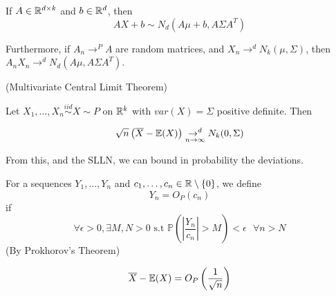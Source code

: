 \documentclass[a4paper]{article}
\begin{document}
If $A \in \mathbb{R}^{d\times k}$ and $b \in \mathbb{R}^{d}$, then
\[
	AX + b \sim N_{d}\left( A\mu + b, A\Sigma A^{T} \right) 
\] 

Furthermore, if $A_{n} \to^{P} A$ are random matrices, and $X_n \to ^{d} N_{k}\left( \mu, \Sigma \right) $, then $A_n X_n \to ^{d} N_{d}\left( A\mu, A\Sigma A^{T} \right) $.

\begin{thm}
	(Multivariate Central Limit Theorem)

	Let $X_1, \ldots, X_n \stackrel{iid}{\sim} X \sim P$ on $\mathbb{R}^{k}$ with $var(X) = \Sigma$ positive definite. Then

	 \[
		 \sqrt{n} \left( \overline{X} - \mathbb{E}(X) \right) \underset{n \to \infty}{\to ^{d}} N_{k}(0, \Sigma)
	\] 
\end{thm}

From this, and the SLLN, we can bound in probability the deviations.

\begin{defn}
	For a sequences $Y_1, \ldots, Y_n$ and $c_1, \ldots, c_n \in \mathbb{R}\setminus\{0\}$, we define 
	 \[
		 Y_n = O_{P}(c_n)
	\]
	if
	\[
		\forall \epsilon > 0, \exists M,N > 0 \text{ s.t } \mathbb{P}\left( \left| \frac{Y_n}{c_n} \right| > M \right) < \epsilon \text{  } \forall n > N
	\] (By Prokhorov's Theorem) 
\end{defn}

\begin{corol}
	\[
		\overline{X} - \mathbb{E}(X) = O_P \left(\frac{1}{\sqrt{n} }\right)
	\] 
\end{corol}
\end{document}
